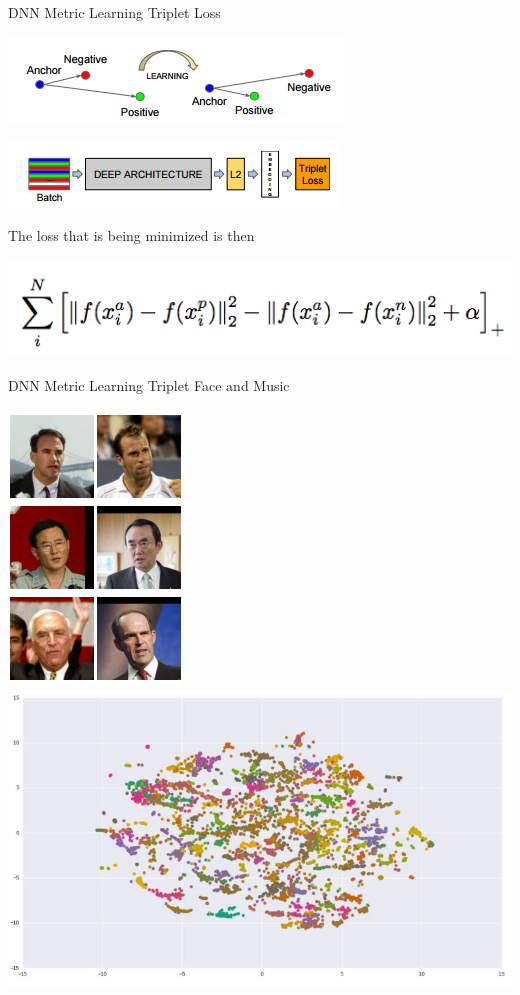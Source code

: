 \documentclass{beamer}
\begin{document}
\begin{frame}{DNN Metric Learning Triplet Loss}
			 \begin{center}
			 	\includegraphics[scale=0.7]{img/ns}
			 \end{center}
	
		 \begin{center}
		 	\includegraphics[scale=0.7]{img/tl2}
		 \end{center}
The loss that is being minimized is then 
	 \begin{center}
	 	\includegraphics[scale=0.4]{img/tl}
	 \end{center}
\end{frame}

\begin{frame}{DNN Metric Learning Triplet Face and Music}
		 \begin{center}
		 	\includegraphics[scale=0.5]{img/face1} \includegraphics[scale=0.3]{img/music}
		 \end{center}
\end{frame}
\end{document}
